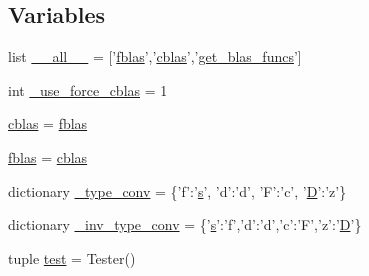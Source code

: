 \subsection*{Variables}
\begin{DoxyCompactItemize}
\item 
list \hyperlink{namespacescipy_1_1lib_1_1blas_a77b86f1a74caf75eaa8989a8dc26b135}{\+\_\+\+\_\+all\+\_\+\+\_\+} = \mbox{[}'\hyperlink{namespacescipy_1_1lib_1_1blas_ad33470cadc93d1c9584675eba6982868}{fblas}','\hyperlink{namespacescipy_1_1lib_1_1blas_a2fa2776dc97751a7ac274545e214a119}{cblas}','\hyperlink{namespacescipy_1_1lib_1_1blas_ad990eae2f5ced520bf4de13a2d0a7cc0}{get\+\_\+blas\+\_\+funcs}'\mbox{]}
\item 
int \hyperlink{namespacescipy_1_1lib_1_1blas_a2e3e14899f9b784a8b934964ee5b3eb7}{\+\_\+use\+\_\+force\+\_\+cblas} = 1
\item 
\hyperlink{namespacescipy_1_1lib_1_1blas_a2fa2776dc97751a7ac274545e214a119}{cblas} = \hyperlink{namespacescipy_1_1lib_1_1blas_ad33470cadc93d1c9584675eba6982868}{fblas}
\item 
\hyperlink{namespacescipy_1_1lib_1_1blas_ad33470cadc93d1c9584675eba6982868}{fblas} = \hyperlink{namespacescipy_1_1lib_1_1blas_a2fa2776dc97751a7ac274545e214a119}{cblas}
\item 
dictionary \hyperlink{namespacescipy_1_1lib_1_1blas_a31c884838b834922b61a9a316d2345ae}{\+\_\+type\+\_\+conv} = \{'f'\+:'\hyperlink{indexexpr_8h_ae024b0db549122b44c349ae28ec990dc}{s}', 'd'\+:'d', 'F'\+:'c', '\hyperlink{odrpack_8h_a7dae6ea403d00f3687f24a874e67d139}{D}'\+:'z'\}
\item 
dictionary \hyperlink{namespacescipy_1_1lib_1_1blas_a47b1f81cd7b79943c15e0a88f7814a9b}{\+\_\+inv\+\_\+type\+\_\+conv} = \{'\hyperlink{indexexpr_8h_ae024b0db549122b44c349ae28ec990dc}{s}'\+:'f','d'\+:'d','c'\+:'F','z'\+:'\hyperlink{odrpack_8h_a7dae6ea403d00f3687f24a874e67d139}{D}'\}
\item 
tuple \hyperlink{namespacescipy_1_1lib_1_1blas_a48d646112fdab56b6166bd0f331feeb7}{test} = Tester()
\end{DoxyCompactItemize}


